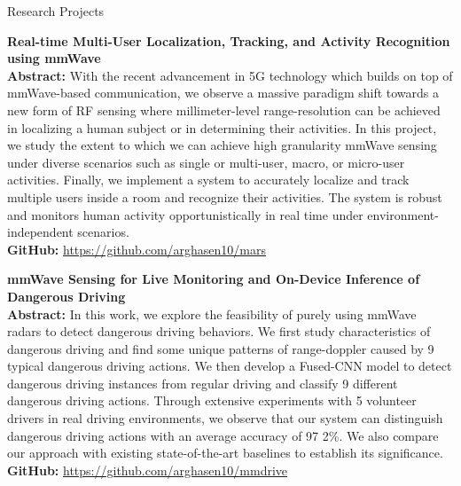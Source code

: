 \documentclass{resume} %
\begin{document}
	\begin{rSection}{Research Projects}
		\begin{rSubsection}{}{}{}{}
			\item \textbf{Real-time Multi-User Localization, Tracking, and Activity Recognition using mmWave}\\
			\textbf{Abstract:} With the recent advancement in 5G technology which builds on top of mmWave-based communication, we observe a massive paradigm shift towards a new form of RF sensing where millimeter-level range-resolution can be achieved in localizing a human subject or in determining their activities. In this project, we study the extent to which we can achieve high granularity mmWave sensing under diverse scenarios such as single or multi-user, macro, or micro-user activities. Finally, we implement a system to accurately localize and track multiple users inside a room and recognize their activities. The system is robust and monitors human activity opportunistically in real time under environment-independent scenarios. \\
			\textbf{GitHub:} \url{https://github.com/arghasen10/mars}
			
			\item \textbf{mmWave Sensing for Live Monitoring and On-Device Inference of Dangerous Driving}\\
			\textbf{Abstract:} In this work, we explore the feasibility of purely using mmWave radars to detect dangerous driving behaviors. We first study characteristics of dangerous driving and find some unique patterns of range-doppler caused by 9 typical dangerous driving actions. We then develop a Fused-CNN model to detect dangerous driving instances from regular driving and classify 9 different dangerous driving actions. Through extensive experiments with 5 volunteer drivers in real driving environments, we observe that our system can distinguish dangerous driving actions with an average accuracy of 97
			2\%. We also compare our approach with existing state-of-the-art baselines to establish its significance. \\
			\textbf{GitHub:} \url{https://github.com/arghasen10/mmdrive}
			
			
		\end{rSubsection}
	\end{rSection}
	
\end{document}
